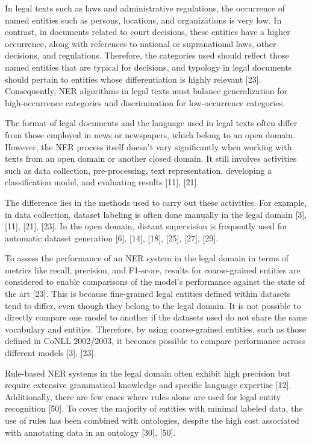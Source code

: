 In legal texts such as laws and administrative regulations, the occurrence of named entities such as persons, locations, and organizations is very low. In contrast, in documents related to court decisions, these entities have a higher occurrence, along with references to national or supranational laws, other decisions, and regulations. Therefore, the categories used should reflect those named entities that are typical for decisions, and typology in legal documents should pertain to entities whose differentiation is highly relevant [23]. Consequently, NER algorithms in legal texts must balance generalization for high-occurrence categories and discrimination for low-occurrence categories.

The format of legal documents and the language used in legal texts often differ from those employed in news or newspapers, which belong to an open domain. However, the NER process itself doesn't vary significantly when working with texts from an open domain or another closed domain. It still involves activities such as data collection, pre-processing, text representation, developing a classification model, and evaluating results [11], [21].

The difference lies in the methods used to carry out these activities. For example, in data collection, dataset labeling is often done manually in the legal domain [3], [11], [21], [23]. In the open domain, distant supervision is frequently used for automatic dataset generation [6], [14], [18], [25], [27], [29].

To assess the performance of an NER system in the legal domain in terms of metrics like recall, precision, and F1-score, results for coarse-grained entities are considered to enable comparisons of the model's performance against the state of the art [23]. This is because fine-grained legal entities defined within datasets tend to differ, even though they belong to the legal domain. It is not possible to directly compare one model to another if the datasets used do not share the same vocabulary and entities. Therefore, by using coarse-grained entities, such as those defined in CoNLL 2002/2003, it becomes possible to compare performance across different models [3], [23].

Rule-based NER systems in the legal domain often exhibit high precision but require extensive grammatical knowledge and specific language expertise [12]. Additionally, there are few cases where rules alone are used for legal entity recognition [50]. To cover the majority of entities with minimal labeled data, the use of rules has been combined with ontologies, despite the high cost associated with annotating data in an ontology [30], [50].

